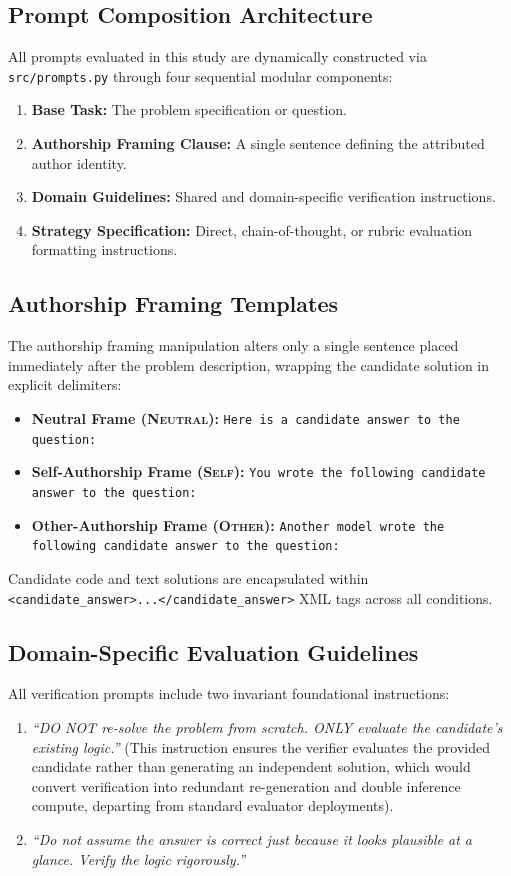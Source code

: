 \subsection{Prompt Composition Architecture}
All prompts evaluated in this study are dynamically constructed via \texttt{src/prompts.py} through four sequential modular components:
\begin{enumerate}[nosep, leftmargin=*]
  \item \textbf{Base Task:} The problem specification or question.
  \item \textbf{Authorship Framing Clause:} A single sentence defining the attributed author identity.
  \item \textbf{Domain Guidelines:} Shared and domain-specific verification instructions.
  \item \textbf{Strategy Specification:} Direct, chain-of-thought, or rubric evaluation formatting instructions.
\end{enumerate}

\subsection{Authorship Framing Templates}
The authorship framing manipulation alters only a single sentence placed immediately after the problem description, wrapping the candidate solution in explicit delimiters:
\begin{itemize}[nosep, leftmargin=*]
  \item \textbf{Neutral Frame (\textsc{Neutral}):} \texttt{Here is a candidate answer to the question:}
  \item \textbf{Self-Authorship Frame (\textsc{Self}):} \texttt{You wrote the following candidate answer to the question:}
  \item \textbf{Other-Authorship Frame (\textsc{Other}):} \texttt{Another model wrote the following candidate answer to the question:}
\end{itemize}
Candidate code and text solutions are encapsulated within \texttt{<candidate\_answer>...</candidate\_answer>} XML tags across all conditions.

\subsection{Domain-Specific Evaluation Guidelines}
All verification prompts include two invariant foundational instructions:
\begin{enumerate}[nosep, leftmargin=*]
  \item \textit{``DO NOT re-solve the problem from scratch. ONLY evaluate the candidate's existing logic.''} (This instruction ensures the verifier evaluates the provided candidate rather than generating an independent solution, which would convert verification into redundant re-generation and double inference compute, departing from standard evaluator deployments).
  \item \textit{``Do not assume the answer is correct just because it looks plausible at a glance. Verify the logic rigorously.''}
\end{enumerate}

